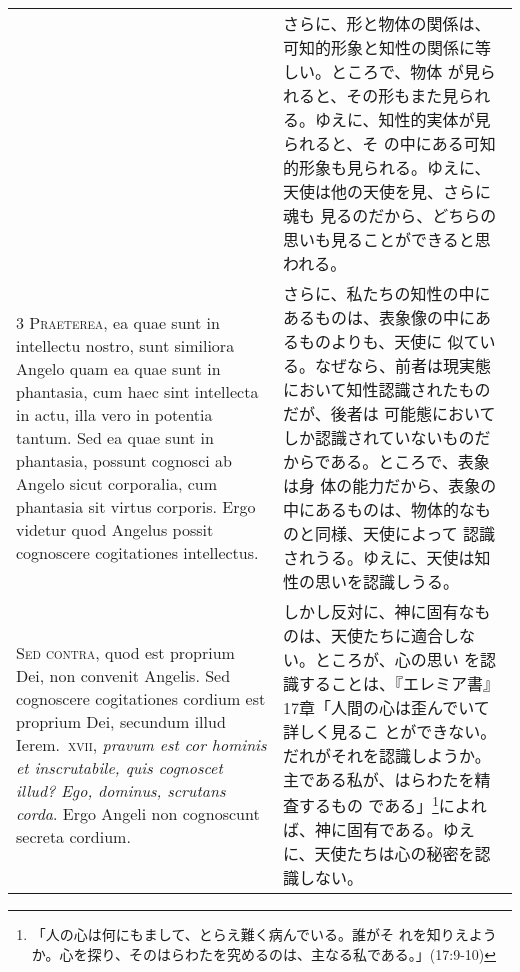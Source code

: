 \documentclass[10pt]{jsarticle} %
\begin{document}
\begin{longtable}{p{21em}p{21em}}
 
&

さらに、形と物体の関係は、可知的形象と知性の関係に等しい。ところで、物体
 が見られると、その形もまた見られる。ゆえに、知性的実体が見られると、そ
 の中にある可知的形象も見られる。ゆえに、天使は他の天使を見、さらに魂も
 見るのだから、どちらの思いも見ることができると思われる。


\\



{\scshape 3 Praeterea}, ea quae sunt in intellectu
 nostro, sunt similiora Angelo quam ea quae sunt in phantasia, cum haec
 sint intellecta in actu, illa vero in potentia tantum. Sed ea quae sunt
 in phantasia, possunt cognosci ab Angelo sicut corporalia, cum
 phantasia sit virtus corporis. Ergo videtur quod Angelus possit
 cognoscere cogitationes intellectus.

 
&

さらに、私たちの知性の中にあるものは、表象像の中にあるものよりも、天使に
 似ている。なぜなら、前者は現実態において知性認識されたものだが、後者は
 可能態においてしか認識されていないものだからである。ところで、表象は身
 体の能力だから、表象の中にあるものは、物体的なものと同様、天使によって
 認識されうる。ゆえに、天使は知性の思いを認識しうる。


\\



{\scshape  Sed contra}, quod est proprium Dei, non
 convenit Angelis. Sed cognoscere cogitationes cordium est proprium Dei,
 secundum illud Ierem.~{\scshape xvii}, {\itshape pravum est cor hominis et inscrutabile,
 quis cognoscet illud? Ego, dominus, scrutans corda}. Ergo Angeli non
 cognoscunt secreta cordium.

 
&

しかし反対に、神に固有なものは、天使たちに適合しない。ところが、心の思い
 を認識することは、『エレミア書』17章「人間の心は歪んでいて詳しく見るこ
 とができない。だれがそれを認識しようか。主である私が、はらわたを精査するもの
 である」\footnote{「人の心は何にもまして、とらえ難く病んでいる。誰がそ
 れを知りえようか。心を探り、そのはらわたを究めるのは、主なる私である。」(17:9-10)}によれば、神に固有である。ゆえに、天使たちは心の秘密を認識しない。


\\




\end{longtable}
\end{document}
